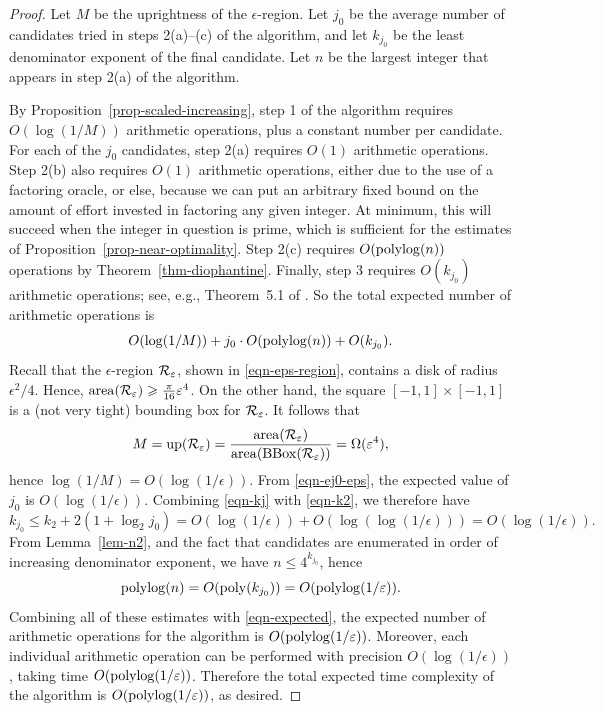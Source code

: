 \documentclass{article}
\begin{document}
\begin{proof}
  Let $M$ be the uprightness of the $\epsilon$-region. Let $j_0$ be
  the average number of candidates tried in steps 2(a)--(c) of the
  algorithm, and let $k_{j_0}$ be the least denominator exponent of
  the final candidate. Let $n$ be the largest integer that appears in
  step 2(a) of the algorithm.

  By Proposition~\ref{prop-scaled-increasing}, step 1 of the algorithm
  requires $O(\log(1/M))$ arithmetic operations, plus a constant
  number per candidate. For each of the $j_0$ candidates, step 2(a)
  requires $O(1)$ arithmetic operations. Step 2(b) also requires
  $O(1)$ arithmetic operations, either due to the use of a factoring
  oracle, or else, because we can put an arbitrary fixed bound on the
  amount of effort invested in factoring any given integer. At
  minimum, this will succeed when the integer in question is prime,
  which is sufficient for the estimates of
  Proposition~\ref{prop-near-optimality}. Step 2(c) requires
  $O(\mathop{\rm polylog}\nolimits(n))$ operations by
  Theorem~\ref{thm-diophantine}. Finally, step 3 requires $O(k_{j_0})$
  arithmetic operations; see, e.g., Theorem~5.1 of
  {\cite{ma-remarks}}. So the total expected number of arithmetic
  operations is
  \begin{equation} \label{eqn-expected}
    O(\log(1/M)) + j_0\cdot O(\mathop{\rm polylog}\nolimits(n)) + O(k_{j_0}).
  \end{equation}
  Recall that the $\epsilon$-region ${\cal R}_{\varepsilon}$, shown in
  {\eqref{eqn-eps-region}}, contains a disk of radius $\epsilon^2/4$.
  Hence, $\mathop{\rm area}\nolimits({\cal R}_{\varepsilon})\geqslant \frac{\pi}{16}\varepsilon^4$. On the
  other hand, the square $[-1,1]\times[-1,1]$ is a (not very tight)
  bounding box for ${\cal R}_{\varepsilon}$. It follows that 
  \[ M = \mathop{\rm up}\nolimits({\cal R}_{\varepsilon}) = \frac{\mathop{\rm area}\nolimits({\cal R}_{\varepsilon})}{\mathop{\rm area}\nolimits(\mathop{{\rm BBox}}\nolimits({\cal R}_{\varepsilon}))} =
  \Omega(\varepsilon^4),
  \]
  hence $\log(1/M) = O(\log(1/\epsilon))$. From {\eqref{eqn-ej0-eps}},
  the expected value of $j_0$ is $O(\log({1}/{\epsilon}))$.
  Combining {\eqref{eqn-kj}} with {\eqref{eqn-k2}}, we therefore have
  \[ k_{j_0} \leq k_2+2(1+\log_2 j_0) = O(\log({1}/{\epsilon})) +
  O(\log(\log(1/\epsilon))) = O(\log(1/\epsilon)).
  \]
  From Lemma~\ref{lem-n2}, and the fact that candidates are enumerated
  in order of increasing denominator exponent, we have $n\leq
  4^{k_{j_0}}$, hence
  \[ \mathop{\rm polylog}\nolimits(n) = O(\mathop{\rm poly}\nolimits(k_{j_0})) = O(\mathop{\rm polylog}\nolimits(1/{\varepsilon})).
  \]
  Combining all of these estimates with {\eqref{eqn-expected}}, the
  expected number of arithmetic operations for the algorithm is
  $O(\mathop{\rm polylog}\nolimits(1/{\varepsilon}))$. Moreover, each individual arithmetic
  operation can be performed with precision $O(\log(1/\epsilon))$,
  taking time $O(\mathop{\rm polylog}\nolimits(1/{\varepsilon}))$. Therefore the total
  expected time complexity of the algorithm is
  $O(\mathop{\rm polylog}\nolimits(1/{\varepsilon}))$, as desired.
\end{proof}
\end{document}

